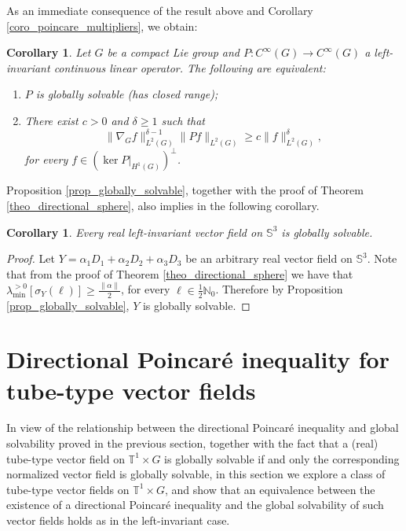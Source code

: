 \documentclass[11pt]{amsart}
\numberwithin{theorem}{section}
\numberwithin{equation}{section}
\newtheorem{corollary}[theorem]{Corollary}
\theoremstyle{definition}
\numberwithin{example}{section}
\theoremstyle{definition}
\theoremstyle{definition}
\newcommand{\N}{\mathbb{N}}
\newcommand{\T}{\mathbb{T}}
\renewcommand{\S}{\mathbb{S}^3}
\begin{document}
As an immediate consequence of the result above and Corollary \ref{coro_poincare_multipliers}, we obtain:
\begin{corollary}
    Let $G$ be a compact Lie group and $P:C^\infty(G)\to C^\infty(G)$ a left-invariant continuous linear operator. The following are equivalent:
    \begin{enumerate}
        \item $P$ is globally solvable (has closed range);
        \item There exist $c>0$ and $\delta\geq 1$ such that
        \begin{equation*}
        \|\nabla_{G} f\|_{L^2(G)}^{\delta-1}\| Pf\|_{L^2(G)}\geq c\|f\|_{L^2(G)}^\delta,
    \end{equation*}
    for every $f\in (\ker P|_{H^1(G)})^\perp$.
    \end{enumerate}
\end{corollary}





Proposition \ref{prop_globally_solvable}, together with the proof of Theorem \ref{theo_directional_sphere}, also implies in the following corollary.

\begin{corollary}\label{coro_GS_sphere}
    Every real left-invariant vector field on $\S$ is globally solvable.
\end{corollary}
\begin{proof}
    Let $Y=\alpha_1 D_1+\alpha_2 D_2+\alpha_3 D_3$ be an arbitrary real vector field on $\S$. Note that from the proof of Theorem \ref{theo_directional_sphere} we have that $\lambda_{\min}^{>0}[\sigma_Y(\ell)]\geq \frac{\|\alpha\|}{2}$, for every $\ell\in\frac{1}{2}\N_0$. Therefore by Proposition \ref{prop_globally_solvable}, $Y$ is globally solvable.
\end{proof}






\section{Directional Poincaré inequality for tube-type vector fields}\label{sect_tube}


In view of the relationship between the directional Poincaré inequality and global solvability proved in the previous section, together with the fact that a (real) tube-type vector field on $\T^1\times G$ is globally solvable if and only the corresponding normalized vector field is globally solvable, in this section we explore a class of tube-type vector fields on $\T^1\times G$, and show that an equivalence between the existence of a directional Poincaré inequality and the global solvability of such vector fields holds as in the left-invariant case.
\end{document}

